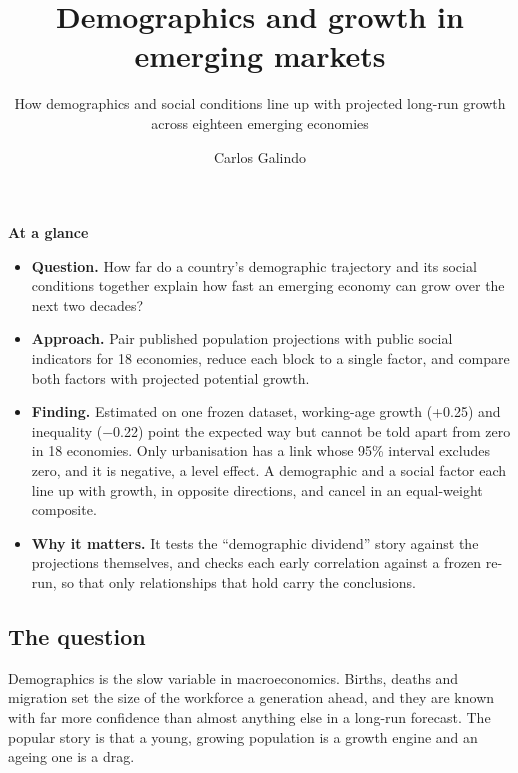 \documentclass[
  british,
  a4paper,
]{article}
\title{Demographics and growth in emerging markets}
\subtitle{How demographics and social conditions line up with projected
long-run growth across eighteen emerging economies}
\author{Carlos Galindo}
\date{}
\providecommand{\tightlist}{%
  \setlength{\itemsep}{0pt}\setlength{\parskip}{0pt}}
\begin{document}
\maketitle


\begin{tcolorbox}[enhanced jigsaw, arc=.35mm, bottomrule=.15mm, breakable, colback=white, colframe=quarto-callout-note-color-frame, left=2mm, leftrule=.75mm, opacityback=0, rightrule=.15mm, toprule=.15mm]

\vspace{-3mm}\textbf{At a glance}\vspace{3mm}

\begin{itemize}
\tightlist
\item
  \textbf{Question.} How far do a country's demographic trajectory and
  its social conditions together explain how fast an emerging economy
  can grow over the next two decades?
\item
  \textbf{Approach.} Pair published population projections with public
  social indicators for 18 economies, reduce each block to a single
  factor, and compare both factors with projected potential growth.
\item
  \textbf{Finding.} Estimated on one frozen dataset, working-age growth
  (+0.25) and inequality (−0.22) point the expected way but cannot be
  told apart from zero in 18 economies. Only urbanisation has a link
  whose 95\% interval excludes zero, and it is negative, a level effect.
  A demographic and a social factor each line up with growth, in
  opposite directions, and cancel in an equal-weight composite.
\item
  \textbf{Why it matters.} It tests the ``demographic dividend'' story
  against the projections themselves, and checks each early correlation
  against a frozen re-run, so that only relationships that hold carry
  the conclusions.
\end{itemize}

\end{tcolorbox}

\subsection{The question}\label{the-question}

Demographics is the slow variable in macroeconomics. Births, deaths and
migration set the size of the workforce a generation ahead, and they are
known with far more confidence than almost anything else in a long-run
forecast. The popular story is that a young, growing population is a
growth engine and an ageing one is a drag.
\end{document}
